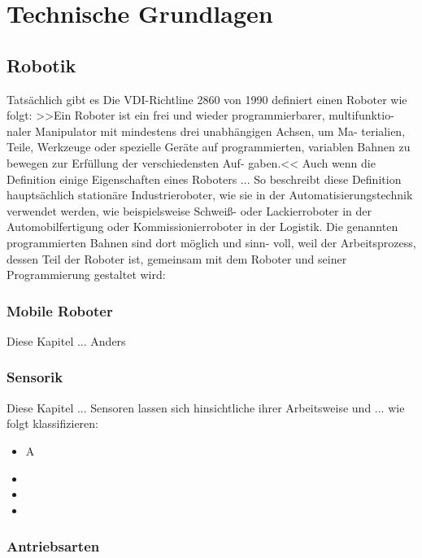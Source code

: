 \section{Technische Grundlagen}
\subsection{Robotik} %
\color{process}
Tatsächlich gibt es 
Die VDI-Richtline 2860 von 1990 definiert einen Roboter wie folgt:
\newline
>>Ein Roboter ist ein frei und wieder programmierbarer, multifunktio-
naler Manipulator mit mindestens drei unabhängigen Achsen, um Ma-
terialien, Teile, Werkzeuge oder spezielle Geräte auf programmierten,
variablen Bahnen zu bewegen zur Erfüllung der verschiedensten Auf-
gaben.<<
\newline
Auch wenn die Definition einige Eigenschaften eines Roboters ... So beschreibt diese Definition 
hauptsächlich stationäre Industrieroboter, wie sie in der Automatisierungstechnik verwendet werden,
wie beispielsweise Schweiß- oder Lackierroboter in der Automobilfertigung oder Kommissionierroboter 
in der Logistik. Die genannten programmierten Bahnen sind dort möglich und sinn-
voll, weil der Arbeitsprozess, dessen Teil der Roboter ist, gemeinsam mit dem
Roboter und seiner Programmierung gestaltet wird:
\subsubsection{Mobile Roboter}
\color{process}
Diese Kapitel ...
Anders 
\subsubsection{Sensorik}
\color{process}
Diese Kapitel ...
Sensoren lassen sich hinsichtliche ihrer Arbeitsweise und ... wie folgt klassifizieren:
\begin{itemize}
	\item{} A
	\item{} 
	\item{} 
	\item{} 
\end{itemize}
\subsubsection{Antriebsarten}

